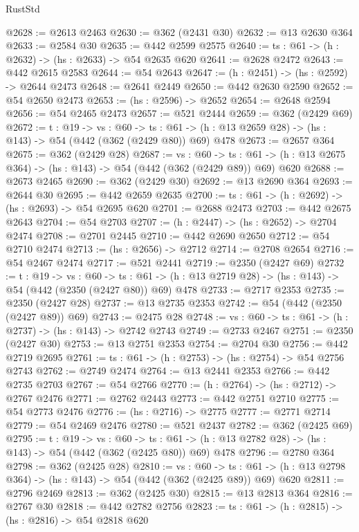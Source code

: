 \begin{lexlean}{RustStd}
\begin{coremodule}
@2628 := @2613 @2463
@2630 := @362 (@2431 @30)
@2632 := @13 @2630 @364
@2633 := @2584 @30
@2635 := @442 @2599 @2575
@2640 := {ts : @61} -> (h : @2632) -> (hs : @2633) -> @54 @2635 @620
@2641 := @2628 @2472
@2643 := @442 @2615 @2583
@2644 := @54 @2643
@2647 := (h : @2451) -> (hs : @2592) -> @2644 @2473
@2648 := @2641 @2449
@2650 := @442 @2630 @2590
@2652 := @54 @2650 @2473
@2653 := (hs : @2596) -> @2652
@2654 := @2648 @2594
@2656 := @54 @2465 @2473
@2657 := @521 @2444
@2659 := @362 (@2429 @69)
@2672 := {t : @19} ->
  {vs : @60} ->
  {ts : @61} -> (h : @13 @2659 @28) -> (hs : @143) -> @54 (@442 (@362 (@2429 @80)) @69) @478
@2673 := @2657 @364
@2675 := @362 (@2429 @28)
@2687 := {vs : @60} ->
  {ts : @61} -> (h : @13 @2675 @364) -> (hs : @143) -> @54 (@442 (@362 (@2429 @89)) @69) @620
@2688 := @2673 @2465
@2690 := @362 (@2429 @30)
@2692 := @13 @2690 @364
@2693 := @2644 @30
@2695 := @442 @2659 @2635
@2700 := {ts : @61} -> (h : @2692) -> (hs : @2693) -> @54 @2695 @620
@2701 := @2688 @2473
@2703 := @442 @2675 @2643
@2704 := @54 @2703
@2707 := (h : @2447) -> (hs : @2652) -> @2704 @2474
@2708 := @2701 @2445
@2710 := @442 @2690 @2650
@2712 := @54 @2710 @2474
@2713 := (hs : @2656) -> @2712
@2714 := @2708 @2654
@2716 := @54 @2467 @2474
@2717 := @521 @2441
@2719 := @2350 (@2427 @69)
@2732 := {t : @19} ->
  {vs : @60} ->
  {ts : @61} -> (h : @13 @2719 @28) -> (hs : @143) -> @54 (@442 (@2350 (@2427 @80)) @69) @478
@2733 := @2717 @2353
@2735 := @2350 (@2427 @28)
@2737 := @13 @2735 @2353
@2742 := @54 (@442 (@2350 (@2427 @89)) @69)
@2743 := @2475 @28
@2748 := {vs : @60} -> {ts : @61} -> (h : @2737) -> (hs : @143) -> @2742 @2743
@2749 := @2733 @2467
@2751 := @2350 (@2427 @30)
@2753 := @13 @2751 @2353
@2754 := @2704 @30
@2756 := @442 @2719 @2695
@2761 := {ts : @61} -> (h : @2753) -> (hs : @2754) -> @54 @2756 @2743
@2762 := @2749 @2474
@2764 := @13 @2441 @2353
@2766 := @442 @2735 @2703
@2767 := @54 @2766
@2770 := (h : @2764) -> (hs : @2712) -> @2767 @2476
@2771 := @2762 @2443
@2773 := @442 @2751 @2710
@2775 := @54 @2773 @2476
@2776 := (hs : @2716) -> @2775
@2777 := @2771 @2714
@2779 := @54 @2469 @2476
@2780 := @521 @2437
@2782 := @362 (@2425 @69)
@2795 := {t : @19} ->
  {vs : @60} ->
  {ts : @61} -> (h : @13 @2782 @28) -> (hs : @143) -> @54 (@442 (@362 (@2425 @80)) @69) @478
@2796 := @2780 @364
@2798 := @362 (@2425 @28)
@2810 := {vs : @60} ->
  {ts : @61} -> (h : @13 @2798 @364) -> (hs : @143) -> @54 (@442 (@362 (@2425 @89)) @69) @620
@2811 := @2796 @2469
@2813 := @362 (@2425 @30)
@2815 := @13 @2813 @364
@2816 := @2767 @30
@2818 := @442 @2782 @2756
@2823 := {ts : @61} -> (h : @2815) -> (hs : @2816) -> @54 @2818 @620

\end{coremodule}
\end{lexlean}
